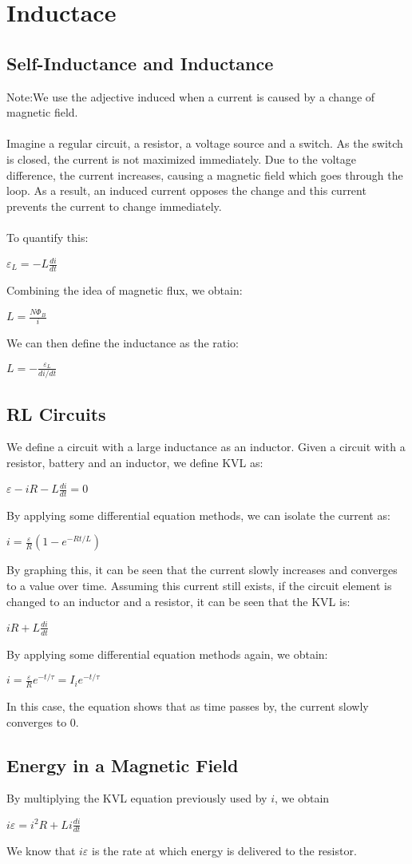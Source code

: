 \documentclass{report}
\begin{document}
\chapter{Inductace}
	\section{Self-Inductance and Inductance}
		Note:We use the adjective induced when a current is caused by a change of magnetic field.\\
		\\
		Imagine a regular circuit, a resistor, a voltage source and a switch. As the switch is closed, the current is not maximized immediately. Due to the voltage difference, the current increases, causing a magnetic field which goes through the loop. As a result, an induced current opposes the change and this current prevents the current to change immediately.\\
		\\
		To quantify this:\\
		\centerline{$\varepsilon_L = -L\frac{di}{dt}$}
		Combining the idea of magnetic flux, we obtain:\\
		\centerline{$L = \frac{N\Phi_B}{i}$}
		We can then define the inductance as the ratio:\\
		\centerline{$L = -\frac{\varepsilon_L}{di/dt}$}
	\section{RL Circuits}
		We define a circuit with a large inductance as an inductor. Given a circuit with a resistor, battery and an inductor, we define KVL as:\\
		\centerline{$\varepsilon - iR - L\frac{di}{dt} = 0$}
		By applying some differential equation methods, we can isolate the current as:\\
		\centerline{$ i = \frac{\varepsilon}{R} (1 - e^{-Rt/L})$}
		By graphing this, it can be seen that the current slowly increases and converges to a value over time. Assuming this current still exists, if the circuit element is changed to an inductor and a resistor, it can be seen that the KVL is:\\
		\centerline{$iR + L\frac{di}{dt}$}
		By applying some differential equation methods again, we obtain:\\
		\centerline{$i = \frac{\varepsilon}{R}e^{-t/\tau} = I_ie^{-t/\tau}$}
		In this case, the equation shows that as time passes by, the current slowly converges to 0.
	\section{Energy in a Magnetic Field}
		By multiplying the KVL equation previously used by $i$, we obtain\\
		\centerline{$i\varepsilon = i^2R + Li\frac{di}{dt}$}
		We know that $i\varepsilon$ is the rate at which energy is delivered to the resistor.
\end{document}
